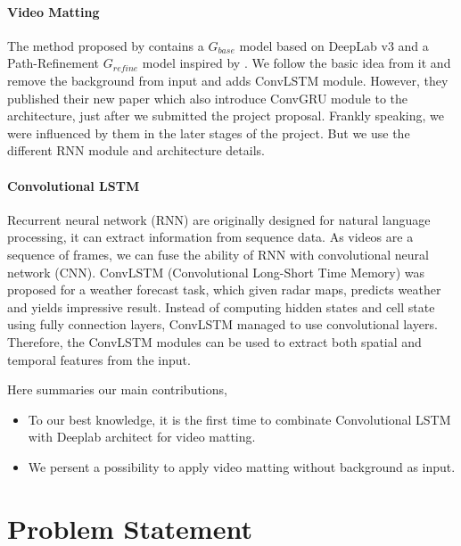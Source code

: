 \documentclass[final]{cvpr}
\begin{document}
\paragraph{Video Matting}

The method proposed by \cite{linRealTimeHighResolutionBackground2020a} contains a $G_{base}$ model based on DeepLab v3 and a Path-Refinement $G_{refine}$ model inspired by \cite{kirillovPointRendImageSegmentation2020}.
We follow the basic idea from it and remove the background from input and adds ConvLSTM module.
However, they published their new paper \cite{linRobustHighResolutionVideo2021} which also introduce ConvGRU module to the architecture, just after we submitted the project proposal.
Frankly speaking, we were influenced by them in the later stages of the project.
But we use the different RNN module and architecture details.

\paragraph{Convolutional LSTM}

Recurrent neural network (RNN) are originally designed for natural language processing, it can extract information from sequence data.
As videos are a sequence of frames, we can fuse the ability of RNN with convolutional neural network (CNN).
ConvLSTM (Convolutional Long-Short Time Memory) \cite{shiConvolutionalLSTMNetwork2015} was proposed for a weather forecast task, which given radar maps, predicts weather and yields impressive result.
Instead of computing hidden states and cell state using fully connection layers, ConvLSTM managed to use convolutional layers.
Therefore, the ConvLSTM modules can be used to extract both spatial and temporal features from the input.

Here summaries our main contributions,

\begin{itemize}
    \item To our best knowledge, it is the first time to combinate Convolutional LSTM with Deeplab architect for video matting.
    \item We persent a possibility to apply video matting without background as input.
\end{itemize}

\section{Problem Statement}
\end{document}
